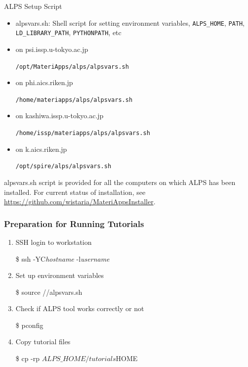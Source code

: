 \begin{frame}{ALPS Setup Script}
  \begin{itemize}
  \item alpsvars.sh: Shell script for setting environment variables, {\tt ALPS\_HOME}, {\tt PATH}, {\tt LD\_LIBRARY\_PATH}, {\tt PYTHONPATH}, etc
  \item on psi.issp.u-tokyo.ac.jp

    {\tt /opt/MateriApps/alps/alpsvars.sh}
  \item on phi.aics.riken.jp
    
    {\tt /home/materiapps/alps/alpsvars.sh}
  \item on kashiwa.issp.u-tokyo.ac.jp
    
    {\tt /home/issp/materiapps/alps/alpsvars.sh}
  \item on k.aics.riken.jp
    
    {\tt /opt/spire/alps/alpsvars.sh}
  \end{itemize}
  \begin{alertblock}{}
    alpsvars.sh script is provided for all the computers on which ALPS has been installed. For current status of installation, see \footnotesize \url{https://github.com/wistaria/MateriAppsInstaller}.
\end{alertblock}
\end{frame}

\begin{frame}[fragile]
  \frametitle{Preparation for Running Tutorials}
  \begin{enumerate}
  \item SSH login to workstation
\begin{semiverbatim}
\$ ssh -YC{\it hostname} -l{\it username}
\end{semiverbatim}
  \item Set up environment variables
\begin{semiverbatim}
\$ source /\!/alpsvars.sh
\end{semiverbatim}
  \item Check if ALPS tool works correctly or not
\begin{semiverbatim}
\$ pconfig
\end{semiverbatim}
  \item Copy tutorial files
\begin{semiverbatim}
\$ cp -rp $ALPS\_HOME/tutorials $HOME
\end{semiverbatim}
  \end{enumerate}
\end{frame}

